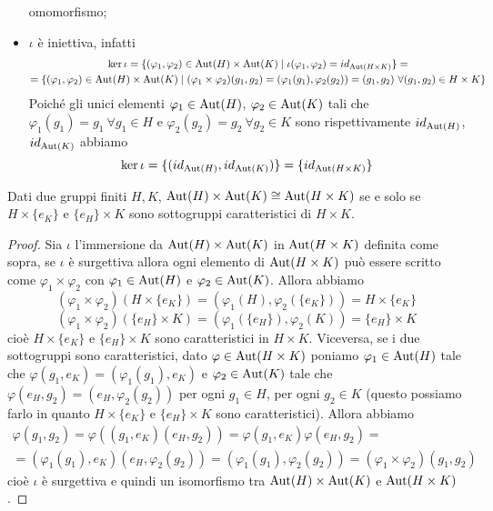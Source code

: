 \documentclass[11pt]{scrartcl}
\begin{document}
\begin{itemize}
    omomorfismo;
    \item$\iota$ è iniettiva, infatti \begin{multline*}
        \ker \iota = \{(\varphi_1, \varphi_2) \in \operatorname{Aut}(H)\times \operatorname{Aut}(K) \mid
        \iota(\varphi_1, \varphi_2) = id_{\operatorname{Aut}(H\times K)}\} = \\
        = \{(\varphi_1, \varphi_2) \in \operatorname{Aut}(H)\times \operatorname{Aut}(K)\mid 
        (\varphi_1\times\varphi_2)(g_1, g_2) = (\varphi_1(g_1), \varphi_2(g_2)) = (g_1, g_2)~\forall 
        (g_1, g_2) \in H\times K\}
    \end{multline*} Poiché gli unici elementi $\varphi_1 \in \operatorname{Aut}(H)$,
    $\varphi_2 \in \operatorname{Aut}(K)$ tali che $\varphi_1(g_1) = g_1 ~\forall g_1 \in H$ e $\varphi_2(g_2) = g_2 ~\forall g_2 \in K$
    sono rispettivamente $id_{\operatorname{Aut}(H)}$, $id_{\operatorname{Aut}(K)}$ abbiamo \[
        \ker\iota = \{(id_{\operatorname{Aut}(H)}, id_{\operatorname{Aut}(K)})\} = \{id_{\operatorname{Aut}(H \times K)}\}
    \] 

\end{itemize}

\begin{proposition}
    Dati due gruppi finiti $H, K$, $\operatorname{Aut}(H)\times \operatorname{Aut}(K)\cong \operatorname{Aut}(H\times K)$
    se e solo se $H\times \{e_K\}$ e $\{e_H\}\times K$ sono sottogruppi 
    caratteristici di $H\times K$.
\end{proposition}

\begin{proof}
    Sia $\iota$ l'immersione da $\operatorname{Aut}(H)\times \operatorname{Aut}(K)$ in $\operatorname{Aut}(H\times K)$ 
    definita come sopra, se $\iota$ è surgettiva allora ogni elemento di 
    $\operatorname{Aut}(H\times K)$ può essere scritto come $\varphi_1\times\varphi_2$ con
    $\varphi_1 \in \operatorname{Aut}(H)$ e $\varphi_2 \in \operatorname{Aut}(K)$. Allora abbiamo 
    \[
        (\varphi_1\times\varphi_2)(H\times\{e_K\}) = 
        (\varphi_1(H), \varphi_2(\{e_K\})) = H\times\{e_K\}
    \]
    \[
        (\varphi_1\times \varphi_2)(\{e_H\}\times K) = 
        (\varphi_1(\{e_H\}), \varphi_2(K)) = \{e_H\}\times K
    \]cioè $H\times\{e_K\}$ e $\{e_H\}\times K$ sono caratteristici in
    $H\times K$. Viceversa, se i due sottogruppi sono caratteristici, dato
    $\varphi \in \operatorname{Aut}(H\times K)$ poniamo $\varphi_1 \in \operatorname{Aut}(H)$ tale che 
    $\varphi(g_1, e_K) = (\varphi_1(g_1), e_K)$ e $\varphi_2 \in \operatorname{Aut}(K)$ 
    tale che $\varphi(e_H, g_2) = (e_H, \varphi_2(g_2))$ per ogni $g_1 \in H$,
    per ogni $g_2 \in K$ (questo possiamo farlo in quanto $H\times\{e_K\}$ 
    e $\{e_H\}\times K$ sono caratteristici). Allora abbiamo 
    \begin{multline*}
        \varphi(g_1, g_2) = \varphi((g_1, e_K)(e_H, g_2)) = 
        \varphi(g_1, e_K)\varphi(e_H, g_2) = \\
        = (\varphi_1(g_1), e_K)(e_H, \varphi_2(g_2)) = 
        (\varphi_1(g_1), \varphi_2(g_2)) = (\varphi_1\times\varphi_2)(g_1, g_2)
    \end{multline*}cioè $\iota$ è surgettiva e quindi un isomorfismo tra
    $\operatorname{Aut}(H)\times \operatorname{Aut}(K)$ e $\operatorname{Aut}(H\times K)$.
\end{proof}
\end{document}
